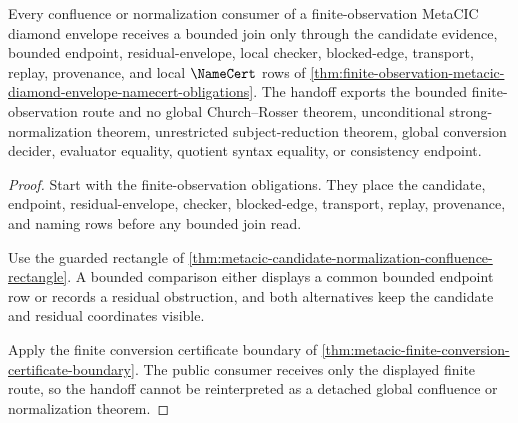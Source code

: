\begin{theorem}
\label{thm:finite-observation-metacic-diamond-envelope-handoff}
Every confluence or normalization consumer of a finite-observation MetaCIC diamond envelope receives a bounded join only through the candidate evidence, bounded endpoint, residual-envelope, local checker, blocked-edge, transport, replay, provenance, and local $\NameCert$ rows of \autoref{thm:finite-observation-metacic-diamond-envelope-namecert-obligations}. The handoff exports the bounded finite-observation route and no global Church--Rosser theorem, unconditional strong-normalization theorem, unrestricted subject-reduction theorem, global conversion decider, evaluator equality, quotient syntax equality, or consistency endpoint.
\end{theorem}
\begin{proof}
Start with the finite-observation obligations. They place the candidate, endpoint, residual-envelope, checker, blocked-edge, transport, replay, provenance, and naming rows before any bounded join read.

Use the guarded rectangle of \autoref{thm:metacic-candidate-normalization-confluence-rectangle}. A bounded comparison either displays a common bounded endpoint row or records a residual obstruction, and both alternatives keep the candidate and residual coordinates visible.

Apply the finite conversion certificate boundary of \autoref{thm:metacic-finite-conversion-certificate-boundary}. The public consumer receives only the displayed finite route, so the handoff cannot be reinterpreted as a detached global confluence or normalization theorem.
\end{proof}

